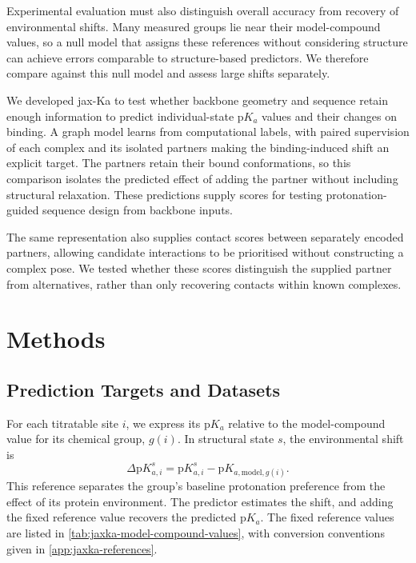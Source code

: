 Experimental evaluation must also distinguish overall accuracy from recovery of environmental shifts. Many measured groups lie near their model-compound values, so a null model that assigns these references without considering structure can achieve errors comparable to structure-based predictors.\supercite{stantonBenchmarkingPKaPrediction2008,reisFastInterpretableDeep2022} We therefore compare against this null model and assess large shifts separately.

We developed jax-Ka to test whether backbone geometry and sequence retain enough information to predict individual-state $\mathrm{p}K_a$ values and their changes on binding. A graph model learns from computational labels, with paired supervision of each complex and its isolated partners making the binding-induced shift an explicit target. The partners retain their bound conformations, so this comparison isolates the predicted effect of adding the partner without including structural relaxation. These predictions supply scores for testing protonation-guided sequence design from backbone inputs.

The same representation also supplies contact scores between separately encoded partners, allowing candidate interactions to be prioritised without constructing a complex pose. We tested whether these scores distinguish the supplied partner from alternatives, rather than only recovering contacts within known complexes.

\section{Methods}
\label{sec:jaxka-methods}

\subsection{Prediction Targets and Datasets}
\label{sec:jaxka-states}

For each titratable site $i$, we express its $\mathrm{p}K_a$ relative to the model-compound value for its chemical group, $g(i)$. In structural state $s$, the environmental shift is
\begin{equation}
    \Delta\mathrm{p}K_{a,i}^{s}
    = \mathrm{p}K_{a,i}^{s}
    - \mathrm{p}K_{a,\mathrm{model},g(i)}.
    \label{eq:jaxka-model-compound-shift}
\end{equation}
This reference separates the group's baseline protonation preference from the effect of its protein environment.\supercite{liVeryFastEmpirical2005,olssonPROPKA3ConsistentTreatment2011} The predictor estimates the shift, and adding the fixed reference value recovers the predicted $\mathrm{p}K_a$. The fixed reference values are listed in \cref{tab:jaxka-model-compound-values}, with conversion conventions given in \cref{app:jaxka-references}.

